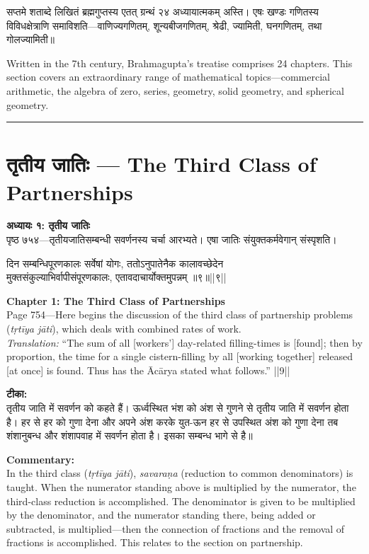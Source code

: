 \documentclass[10pt,a4paper]{article}
\newcommand{\dev}[1]{{\devanagarifont #1}}
\newcommand{\longline}{\noindent\rule{\textwidth}{0.4pt}}
\newcommand{\vnum}[1]{\hfill\textnormal{||#1||}}
\newenvironment{shloka}{%
  \begin{lrbox}{\shlokabox}
  \begin{minipage}{\dimexpr\textwidth-16pt\relax}%
  \devanagarifont\centering\setstretch{1.3}%
}{%
  \end{minipage}%
  \end{lrbox}%
  \par\medskip\noindent\fcolorbox{rulecolor}{versebg}{\usebox{\shlokabox}}\par\medskip
}
\newcommand{\bilingual}[2]{%
  \noindent%
  \begin{minipage}[t]{0.47\textwidth}%
    \setstretch{1.15}#1%
  \end{minipage}%
  \hfill%
  \vrule\hfill%
  \begin{minipage}[t]{0.47\textwidth}%
    \setstretch{1.15}#2%
  \end{minipage}%
  \par\medskip
}
\begin{document}
\bilingual{%
सप्तमे शताब्दे लिखितं ब्रह्मगुप्तस्य एतत् ग्रन्थं २४ अध्यायात्मकम् अस्ति। एषः खण्डः गणितस्य विविधक्षेत्राणि समाविशति---वाणिज्यगणितम्, शून्यबीजगणितम्, श्रेढी, ज्यामिती, घनगणितम्, तथा गोलज्यामिती॥
}{%
Written in the 7th century, Brahmagupta's treatise comprises 24 chapters. This section covers an extraordinary range of mathematical topics---commercial arithmetic, the algebra of zero, series, geometry, solid geometry, and spherical geometry.
}

\vspace{1em}
\noindent\longline
\vspace{1em}

\section{\dev{तृतीय जातिः} --- The Third Class of Partnerships}

\bilingual{%
\textbf{अध्यायः १: तृतीय जातिः}\\[0.3em]
पृष्ठ ७५४---तृतीयजातिसम्बन्धी सवर्णनस्य चर्चा आरभ्यते। एषा जातिः संयुक्तकर्मवेगान् संस्पृशति।\\[0.5em]
\begin{shloka}
दिन सम्बन्धिपूरणकालः सर्वेषां योगः, ततोऽनुपातेनैक कालावच्छेदेन\\
मुक्तसंकुल्याभिर्वापीसंपूरणकालः, एतावदाचार्योक्तमुपन्नम् ॥९॥\vnum{९}
\end{shloka}
}{%
\textbf{Chapter 1: The Third Class of Partnerships}\\[0.3em]
Page 754---Here begins the discussion of the third class of partnership problems (\textit{tṛtīya jāti}), which deals with combined rates of work.\\[0.5em]
\textit{Translation:} ``The sum of all [workers'] day-related filling-times is [found]; then by proportion, the time for a single cistern-filling by all [working together] released [at once] is found. Thus has the Ācārya stated what follows.'' ||9||
}

\bilingual{%
\textbf{टीका:}\\[0.3em]
तृतीय जाति में सवर्णन को कहते हैं। ऊर्ध्वस्थित भंश को अंश से गुणने से तृतीय जाति में सवर्णन होता है। हर से हर को गुणा देना और अपने अंश करके युत-ऊन हर से उपस्थित अंश को गुणा देना तब शंशानुबन्ध और शंशापवाह में सवर्णन होता है। इसका सम्बन्ध भागे से है॥
}{%
\textbf{Commentary:}\\[0.3em]
In the third class (\textit{tṛtīya jāti}), \textit{savaraṇa} (reduction to common denominators) is taught. When the numerator standing above is multiplied by the numerator, the third-class reduction is accomplished. The denominator is given to be multiplied by the denominator, and the numerator standing there, being added or subtracted, is multiplied---then the connection of fractions and the removal of fractions is accomplished. This relates to the section on partnership.
}
\end{document}
